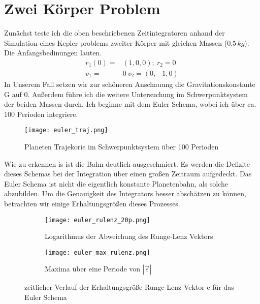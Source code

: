 \documentclass[12pt]{article}
\begin{document}
\section*{Zwei Körper Problem}
Zunächst teste ich die oben beschriebenen Zeitintegratoren anhand der Simulation eines Kepler problems zweiter Körper mit gleichen Massen ($0.5\,kg$). Die Anfangsbedinungen lauten.
\begin{align*}
    r_1(0)=&(1,0,0);\:r_2=0\\
    v_1=&0\:v_2=(0,-1,0)
\end{align*}
In Unserem Fall setzen wir zur schöneren Anschauung die Gravitationskonstante G auf 0. Außerdem führe ich die weitere Untersuchung im Schwerpunktsystem der beiden Massen durch.\newline\newline
Ich beginne mit dem Euler Schema, wobei ich über ca. 100 Perioden integriere. 
\vspace*{-0.1cm}\begin{figure}[H]\centering\texttt{[image: euler\_traj.png]}\caption{Planeten Trajekorie im Schwerpunktsystem über 100 Perioden}\end{figure}
Wie zu erkennen is ist die Bahn deutlich ausgeschmiert. Es werden die Defizite dieses Schemas bei der Integration über einen großen Zeitraum aufgedeckt. Das Euler Schema ist nicht die eigentlich konstante Planetenbahn, als solche abzubilden.
Um die Genauigkeit des Integrators besser abschätzen zu können, betrachten wir einige Erhaltungsgrößen dieses Prozesses.
\begin{figure}[H]
    \hspace*{-1.5cm}
    \begin{subfigure}{0.4\textwidth}
    \texttt{[image: euler\_rulenz\_20p.png]}
    \caption{Logarithmus der Abweichung des Runge-Lenz Vektors}
    \end{subfigure}
    \hfill
    \begin{subfigure}{0.4\textwidth}
    \hspace*{-0.8cm}
    \texttt{[image: euler\_max\_rulenz.png]}
    \caption{Maxima über eine Periode von $|\vec{e}|$}
    \end{subfigure}
    \hfill
    \caption{zeitlicher Verlauf der Erhaltungsgröße Runge-Lenz Vektor e für das Euler Schema}
\end{figure}
\end{document}
